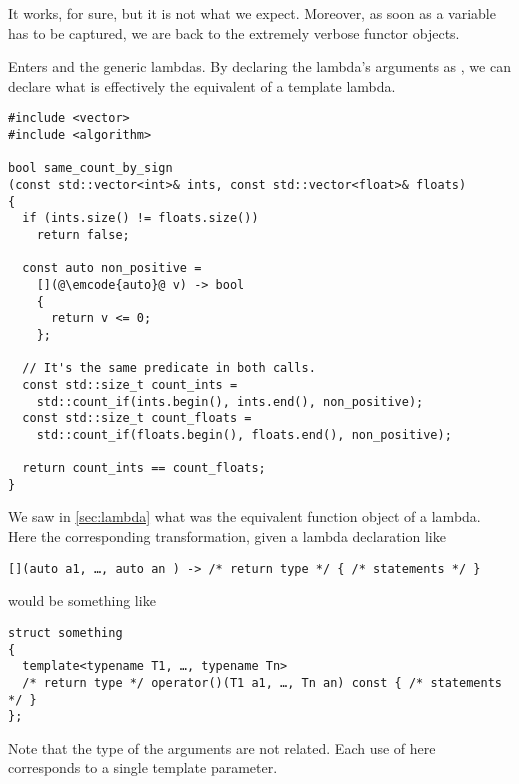 It works, for sure, but it is not what we expect. Moreover, as soon as
a variable has to be captured, we are back to the extremely verbose
functor objects.

\bigskip

Enters  and the generic lambdas. By declaring the lambda's
arguments as , we can declare what is effectively the
equivalent of a template lambda.

\begin{lstlisting}
#include <vector>
#include <algorithm>

bool same_count_by_sign
(const std::vector<int>& ints, const std::vector<float>& floats)
{
  if (ints.size() != floats.size())
    return false;

  const auto non_positive =
    [](@\emcode{auto}@ v) -> bool
    {
      return v <= 0;
    };

  // It's the same predicate in both calls.
  const std::size_t count_ints =
    std::count_if(ints.begin(), ints.end(), non_positive);
  const std::size_t count_floats =
    std::count_if(floats.begin(), floats.end(), non_positive);

  return count_ints == count_floats;
}
\end{lstlisting}

We saw in \ref{sec:lambda} what was the equivalent function object of
a lambda. Here the corresponding transformation, given a lambda
declaration like

\begin{lstlisting}
[](auto a1, …, auto an ) -> /* return type */ { /* statements */ }
\end{lstlisting}

would be something like

\begin{lstlisting}
struct something
{
  template<typename T1, …, typename Tn>
  /* return type */ operator()(T1 a1, …, Tn an) const { /* statements */ }
};
\end{lstlisting}

Note that the type of the arguments are not related. Each use of
 here corresponds to a single template parameter.

